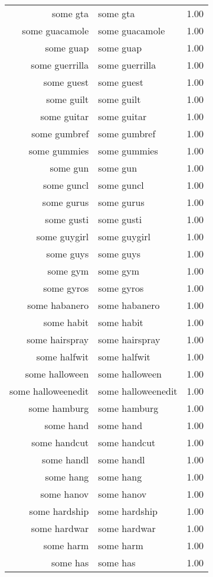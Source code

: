 \begin{table}[ht]
\begin{tabular}{rlr}
  some gta & some gta & 1.00 \\ 
  some guacamole & some guacamole & 1.00 \\ 
  some guap & some guap & 1.00 \\ 
  some guerrilla & some guerrilla & 1.00 \\ 
  some guest & some guest & 1.00 \\ 
  some guilt & some guilt & 1.00 \\ 
  some guitar & some guitar & 1.00 \\ 
  some gumbref & some gumbref & 1.00 \\ 
  some gummies & some gummies & 1.00 \\ 
  some gun & some gun & 1.00 \\ 
  some guncl & some guncl & 1.00 \\ 
  some gurus & some gurus & 1.00 \\ 
  some gusti & some gusti & 1.00 \\ 
  some guygirl & some guygirl & 1.00 \\ 
  some guys & some guys & 1.00 \\ 
  some gym & some gym & 1.00 \\ 
  some gyros & some gyros & 1.00 \\ 
  some habanero & some habanero & 1.00 \\ 
  some habit & some habit & 1.00 \\ 
  some hairspray & some hairspray & 1.00 \\ 
  some halfwit & some halfwit & 1.00 \\ 
  some halloween & some halloween & 1.00 \\ 
  some halloweenedit & some halloweenedit & 1.00 \\ 
  some hamburg & some hamburg & 1.00 \\ 
  some hand & some hand & 1.00 \\ 
  some handcut & some handcut & 1.00 \\ 
  some handl & some handl & 1.00 \\ 
  some hang & some hang & 1.00 \\ 
  some hanov & some hanov & 1.00 \\ 
  some hardship & some hardship & 1.00 \\ 
  some hardwar & some hardwar & 1.00 \\ 
  some harm & some harm & 1.00 \\ 
  some has & some has & 1.00 \\ 

\end{tabular}
\end{table}
